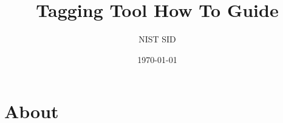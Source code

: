 \documentclass{article}
\title{Tagging Tool How To Guide}
\author{NIST SID}
\date{\today}
\begin{document}
\maketitle

\section{About}







\tableofcontents










\end{document}
